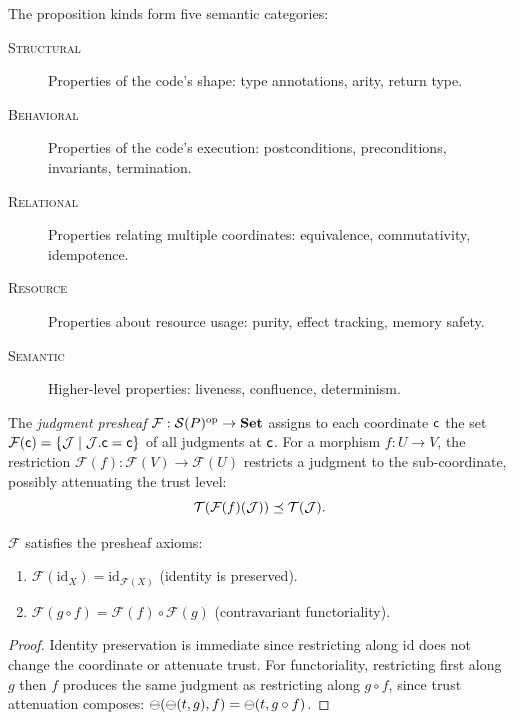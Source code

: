 The proposition kinds form five semantic categories:
\begin{description}
  \item[\textsc{Structural}] Properties of the code's shape: type annotations,
        arity, return type.
  \item[\textsc{Behavioral}] Properties of the code's execution:
        postconditions, preconditions, invariants, termination.
  \item[\textsc{Relational}] Properties relating multiple coordinates:
        equivalence, commutativity, idempotence.
  \item[\textsc{Resource}] Properties about resource usage: purity,
        effect tracking, memory safety.
  \item[\textsc{Semantic}] Higher-level properties: liveness, confluence,
        determinism.
\end{description}

\begin{definition}\label{def:presheaf}
The \emph{judgment presheaf} $\mathcal{F}: \mathcal{S}(P)^{\mathrm{op}} \to \mathbf{Set}$
assigns to each coordinate $\mathsf{c}$ the set
$\mathcal{F}(\mathsf{c}) = \{\mathcal{J} \mid \mathcal{J}.\mathsf{c} = \mathsf{c}\}$
of all judgments at $\mathsf{c}$.  For a morphism $f: U \to V$, the restriction
$\mathcal{F}(f): \mathcal{F}(V) \to \mathcal{F}(U)$ restricts a judgment
to the sub-coordinate, possibly attenuating the trust level:
\[
  \mathcal{T}(\mathcal{F}(f)(\mathcal{J})) \preceq \mathcal{T}(\mathcal{J}).
\]
\end{definition}

\begin{proposition}\label{prop:presheaf}
$\mathcal{F}$ satisfies the presheaf axioms:
\begin{enumerate}
  \item $\mathcal{F}(\mathrm{id}_X) = \mathrm{id}_{\mathcal{F}(X)}$
        (identity is preserved).
  \item $\mathcal{F}(g \circ f) = \mathcal{F}(f) \circ \mathcal{F}(g)$
        (contravariant functoriality).
\end{enumerate}
\end{proposition}

\begin{proof}
Identity preservation is immediate since restricting along $\mathrm{id}$
does not change the coordinate or attenuate trust.  For functoriality,
restricting first along $g$ then $f$ produces the same judgment as
restricting along $g \circ f$, since trust attenuation composes:
$\ominus(\ominus(t, g), f) = \ominus(t, g \circ f)$.
\end{proof}

